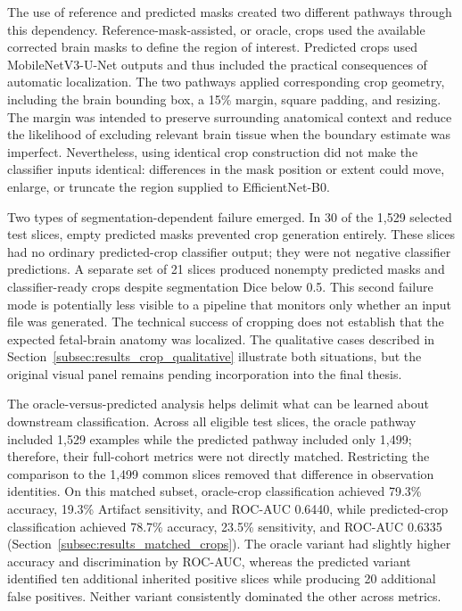 The use of reference and predicted masks created two different pathways through this dependency. Reference-mask-assisted, or oracle, crops used the available corrected brain masks to define the region of interest. Predicted crops used MobileNetV3-U-Net outputs and thus included the practical consequences of automatic localization. The two pathways applied corresponding crop geometry, including the brain bounding box, a 15\% margin, square padding, and resizing. The margin was intended to preserve surrounding anatomical context and reduce the likelihood of excluding relevant brain tissue when the boundary estimate was imperfect. Nevertheless, using identical crop construction did not make the classifier inputs identical: differences in the mask position or extent could move, enlarge, or truncate the region supplied to EfficientNet-B0.

Two types of segmentation-dependent failure emerged. In 30 of the 1,529 selected test slices, empty predicted masks prevented crop generation entirely. These slices had no ordinary predicted-crop classifier output; they were not negative classifier predictions. A separate set of 21 slices produced nonempty predicted masks and classifier-ready crops despite segmentation Dice below 0.5. This second failure mode is potentially less visible to a pipeline that monitors only whether an input file was generated. The technical success of cropping does not establish that the expected fetal-brain anatomy was localized. The qualitative cases described in Section~\ref{subsec:results_crop_qualitative} illustrate both situations, but the original visual panel remains pending incorporation into the final thesis.

The oracle-versus-predicted analysis helps delimit what can be learned about downstream classification. Across all eligible test slices, the oracle pathway included 1,529 examples while the predicted pathway included only 1,499; therefore, their full-cohort metrics were not directly matched. Restricting the comparison to the 1,499 common slices removed that difference in observation identities. On this matched subset, oracle-crop classification achieved 79.3\% accuracy, 19.3\% Artifact sensitivity, and ROC-AUC 0.6440, while predicted-crop classification achieved 78.7\% accuracy, 23.5\% sensitivity, and ROC-AUC 0.6335 (Section~\ref{subsec:results_matched_crops}). The oracle variant had slightly higher accuracy and discrimination by ROC-AUC, whereas the predicted variant identified ten additional inherited positive slices while producing 20 additional false positives. Neither variant consistently dominated the other across metrics.

